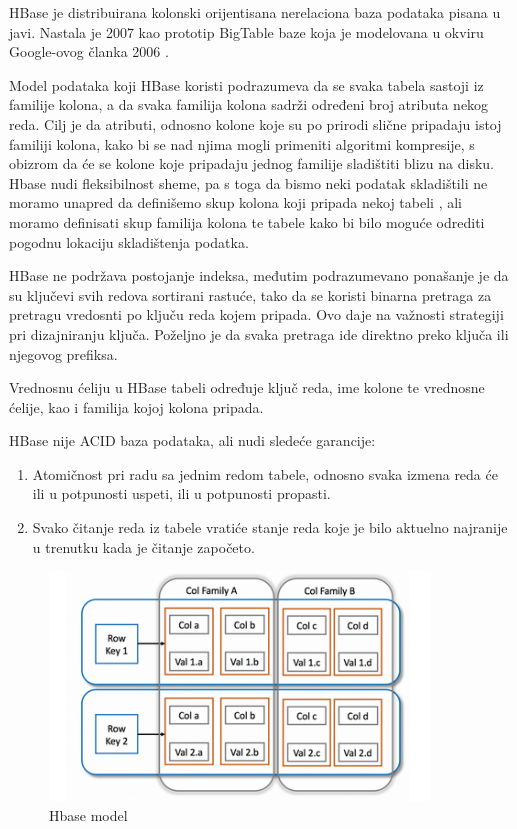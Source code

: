 \documentclass[12pt,oneside]{memoir}
\begin{document}
HBase je distribuirana kolonski orijentisana nerelaciona baza podataka  pisana u javi.  Nastala je 2007 kao prototip BigTable baze koja je modelovana u okviru Google-ovog članka 2006 \cite{BigTable}. 

Model podataka koji HBase koristi podrazumeva da se svaka tabela sastoji iz familije kolona, a da svaka familija kolona sadrži određeni broj atributa nekog reda. Cilj je da atributi, odnosno kolone koje su po prirodi slične pripadaju istoj familiji kolona, kako bi se nad njima mogli primeniti algoritmi kompresije, s obizrom da će se kolone koje pripadaju jednog familije sladištiti blizu na disku. Hbase nudi fleksibilnost sheme, pa s toga da bismo neki podatak skladištili ne moramo unapred da definišemo skup kolona koji pripada nekoj tabeli , ali moramo definisati skup familija kolona te tabele kako bi bilo moguće odrediti pogodnu lokaciju skladištenja podatka.

HBase ne podržava postojanje indeksa, međutim podrazumevano ponašanje je da su ključevi svih redova sortirani rastuće, tako da se koristi binarna pretraga za pretragu vredosnti po ključu reda kojem pripada. Ovo daje na važnosti strategiji pri dizajniranju ključa. Poželjno je da svaka pretraga ide direktno preko ključa ili njegovog prefiksa. 

Vrednosnu ćeliju u HBase tabeli određuje ključ reda, ime kolone te vrednosne ćelije, kao i familija kojoj kolona pripada.

HBase nije ACID baza podataka, ali nudi sledeće garancije: 

\begin{enumerate}
\item[\textbullet] Atomičnost pri radu sa jednim redom tabele, odnosno svaka izmena reda će ili u potpunosti uspeti, ili u potpunosti propasti.
\item[\textbullet] Svako čitanje reda iz tabele vratiće stanje reda koje je bilo aktuelno najranije u trenutku kada je čitanje započeto. 
\end{enumerate}

\begin{figure}[!ht]
  \centering
  \includegraphics[width=0.9\textwidth]{colFamily.png}
  \caption{Hbase model}
  \label{fig:grafikon}
\end{figure}
\end{document}
